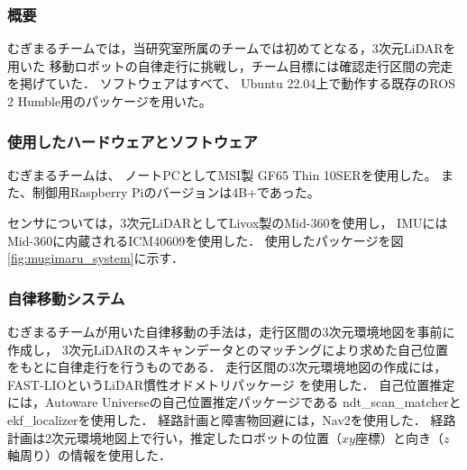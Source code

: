 \documentclass[twocolumn,9pt]{jsproceedings}
\begin{document}
\subsubsection{概要}

むぎまるチームでは，当研究室所属のチームでは初めてとなる，3次元LiDARを用いた
移動ロボットの自律走行に挑戦し，チーム目標には確認走行区間の完走を掲げていた．
ソフトウェアはすべて、
Ubuntu 22.04上で動作する既存のROS 2 Humble用のパッケージを用いた。

\subsubsection{使用したハードウェアとソフトウェア}

むぎまるチームは、
ノートPCとしてMSI製 GF65 Thin 10SERを使用した。
また、制御用Raspberry Piのバージョンは4B+であった。

センサについては，3次元LiDARとしてLivox製のMid-360を使用し，
IMUにはMid-360に内蔵されるICM40609を使用した．
使用したパッケージを図\ref{fig:mugimaru_system}に示す．

\subsubsection{自律移動システム}

むぎまるチームが用いた自律移動の手法は，走行区間の3次元環境地図を事前に作成し，
3次元LiDARのスキャンデータとのマッチングにより求めた自己位置
をもとに自律走行を行うものである．
走行区間の3次元環境地図の作成には，FAST-LIOというLiDAR慣性オドメトリパッケージ
\cite{fastlio}を使用した．
自己位置推定には，Autoware Universeの自己位置推定パッケージである
ndt\_scan\_matcherとekf\_localizerを使用した\cite{autoware}．
経路計画と障害物回避には，Nav2を使用した\cite{nav2}．
経路計画は2次元環境地図上で行い，推定したロボットの位置（$xy$座標）と向き（$z$軸周り）の情報を使用した．
\end{document}
